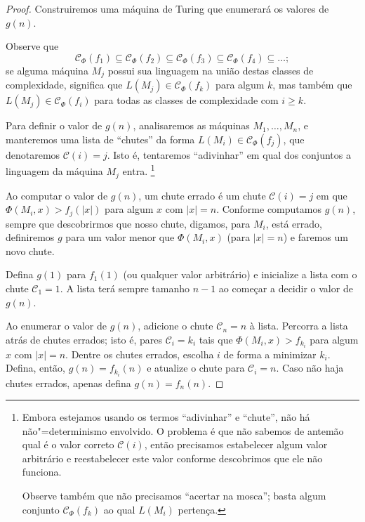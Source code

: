\begin{proof}
    Construiremos uma máquina de Turing
    que enumerará os valores de $g(n)$.

    Observe que
    \begin{equation*}
        \mathcal C_\Phi(f_1) \subseteq
        \mathcal C_\Phi(f_2) \subseteq
        \mathcal C_\Phi(f_3) \subseteq
        \mathcal C_\Phi(f_4) \subseteq
        \dots;
    \end{equation*}
    se alguma máquina $M_j$ possui sua linguagem
    na união destas classes de complexidade,
    significa que $L(M_j) \in \mathcal C_\Phi(f_k)$
    para algum $k$,
    mas também que $L(M_j) \in \mathcal C_\Phi(f_i)$
    para todas as classes de complexidade com $i \geq k$.

    Para definir o valor de $g(n)$,
    analisaremos as máquinas $M_1, \dots, M_n$,
    e manteremos uma lista de ``chutes''
    da forma $L(M_i) \in \mathcal C_\Phi(f_j)$,
    que denotaremos $\mathcal C(i) = j$.
    Isto é, tentaremos ``adivinhar''
    em qual dos conjuntos a linguagem da máquina $M_j$ entra.
    \footnote{
        Embora estejamos usando os termos
        ``adivinhar'' e ``chute'',
        não há não"=determinismo envolvido.
        O problema é que não sabemos de antemão
        qual é o valor correto $\mathcal C(i)$,
        então precisamos estabelecer algum valor arbitrário
        e reestabelecer este valor
        conforme descobrimos que ele não funciona.

        Observe também que não precisamos
        ``acertar na mosca'';
        basta algum conjunto $\mathcal C_\Phi(f_k)$
        ao qual $L(M_i)$ pertença.
    }

    Ao computar o valor de $g(n)$,
    um chute errado
    é um chute $\mathcal C(i) = j$
    em que $\Phi(M_i, x) > f_j(|x|)$
    para algum $x$ com $|x| = n$.
    Conforme computamos $g(n)$,
    sempre que descobrirmos que nosso chute,
    digamos, para $M_i$, está errado,
    definiremos $g$ para um valor menor que $\Phi(M_i, x)$
    (para $|x| = n$)
    e faremos um novo chute.

    Defina $g(1)$ para $f_1(1)$
    (ou qualquer valor arbitrário)
    e inicialize a lista com o chute
    $\mathcal C_1 = 1$.
    A lista terá sempre tamanho $n-1$
    ao começar a decidir o valor de $g(n)$.

    Ao enumerar o valor de $g(n)$,
    adicione o chute $\mathcal C_n = n$ à lista.
    Percorra a lista atrás de chutes errados;
    isto é,
    pares $\mathcal C_i = k_i$
    tais que $\Phi(M_i, x) > f_{k_i}$
    para algum $x$ com $|x| = n$.
    Dentre os chutes errados,
    escolha $i$ de forma a minimizar $k_i$.
    Defina, então, $g(n) = f_{k_i}(n)$
    e atualize o chute para $\mathcal C_i = n$.
    Caso não haja chutes errados,
    apenas defina $g(n) = f_n(n)$.


\end{proof}
